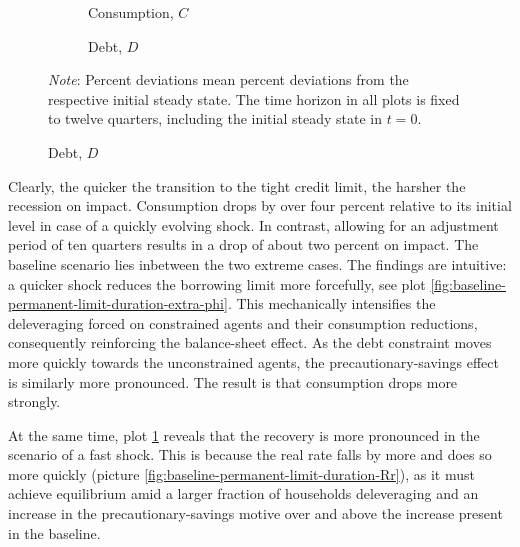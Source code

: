 \documentclass[a4paper,12pt]{article} %
\numberwithin{equation}{section} %
\numberwithin{figure}{section}
\numberwithin{table}{section}
\begin{document}
\begin{figure}[t]
    \centering
    \caption{Baseline Model -- Varying the Duration of a Credit Crunch}
    \label{fig:baseline-permanent-limit-duration}
     \begin{subfigure}[b]{0.49\textwidth}
     \caption{Consumption, $C$}
     \label{fig:baseline-permanent-limit-duration-C}
         \centering
         
     \end{subfigure}
     \hfill
     \begin{subfigure}[b]{0.49\textwidth}
     \caption{Debt, $D$}
     \label{fig:baseline-permanent-limit-duration-D}
         \centering
         
     \end{subfigure}

    \vspace{10pt}
     
     \justifying
     \footnotesize
	\textit{Note}: Percent deviations mean percent deviations from the respective initial steady state. The time horizon in all plots is fixed to twelve quarters, including the initial steady state in $t=0$.
\end{figure}

Clearly, the quicker the transition to the tight credit limit, the harsher the recession on impact. Consumption drops by over four percent relative to its initial level in case of a quickly evolving shock. In contrast, allowing for an adjustment period of ten quarters results in a drop of about two percent on impact. The baseline scenario lies inbetween the two extreme cases. The findings are intuitive: a quicker shock reduces the borrowing limit more forcefully, see plot \ref{fig:baseline-permanent-limit-duration-extra-phi}. This mechanically intensifies the deleveraging forced on constrained agents and their consumption reductions, consequently reinforcing the balance-sheet effect. As the debt constraint moves more quickly towards the unconstrained agents, the precautionary-savings effect is similarly more pronounced. The result is that consumption drops more strongly. 

At the same time, plot \ref{fig:baseline-permanent-limit-duration-C} reveals that the recovery is more pronounced in the scenario of a fast shock. This is because the real rate falls by more and does so more quickly (picture \ref{fig:baseline-permanent-limit-duration-Rr}), as it must achieve equilibrium amid a larger fraction of households deleveraging and an increase in the precautionary-savings motive over and above the increase present in the baseline.
\end{document}
